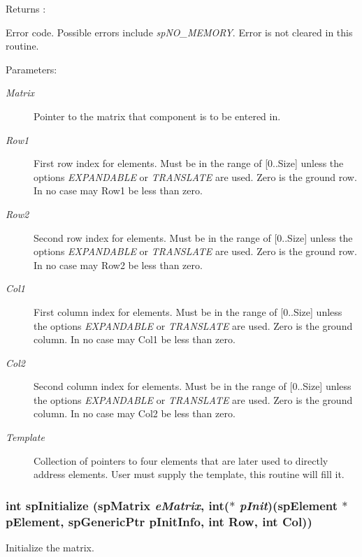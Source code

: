 \begin{Desc}
\item[Returns :]\par
 Error code. Possible errors include {\em sp\-NO\_\-MEMORY}. Error is not cleared in this routine.\end{Desc}
\begin{Desc}
\item[Parameters: ]\par
\begin{description}
\item[{\em 
Matrix}]Pointer to the matrix that component is to be entered in. \item[{\em 
Row1}]First row index for elements. Must be in the range of [0..Size] unless the options {\em EXPANDABLE} or {\em TRANSLATE} are used. Zero is the ground row. In no case may Row1 be less than zero. \item[{\em 
Row2}]Second row index for elements. Must be in the range of [0..Size] unless the options {\em EXPANDABLE} or {\em TRANSLATE} are used. Zero is the ground row. In no case may Row2 be less than zero. \item[{\em 
Col1}]First column index for elements. Must be in the range of [0..Size] unless the options {\em EXPANDABLE} or {\em TRANSLATE} are used. Zero is the ground column. In no case may Col1 be less than zero. \item[{\em 
Col2}]Second column index for elements. Must be in the range of [0..Size] unless the options {\em EXPANDABLE} or {\em TRANSLATE} are used. Zero is the ground column. In no case may Col2 be less than zero. \item[{\em 
Template}]Collection of pointers to four elements that are later used to directly address elements. User must supply the template, this routine will fill it. \end{description}
\end{Desc}
\subsubsection{\setlength{\rightskip}{0pt plus 5cm}int sp\-Initialize ({\bf sp\-Matrix} {\em e\-Matrix}, int($\ast$ {\em p\-Init})({\bf sp\-Element} $\ast$p\-Element,	sp\-Generic\-Ptr p\-Init\-Info,	int Row,	int Col))}\label{spBuild_8c_a21}


Initialize the matrix.

